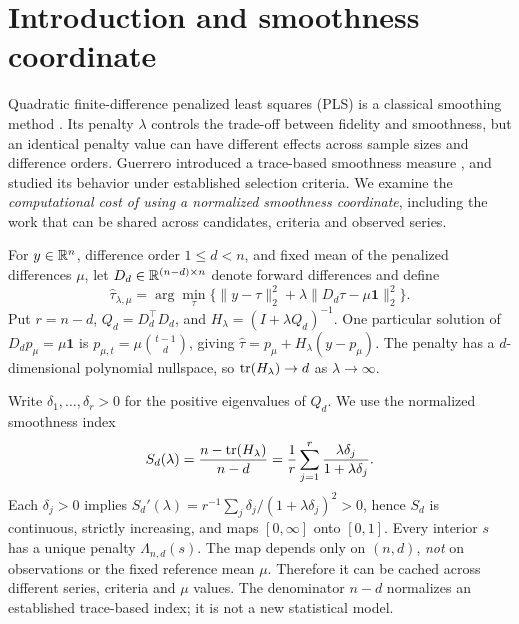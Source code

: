 \section{Introduction and smoothness coordinate}\label{sec:foundation}
Quadratic finite-difference penalized least squares (PLS) is a classical smoothing method \citep{whittaker1923,guerrero2007}. Its penalty $\lambda$ controls the trade-off between fidelity and smoothness, but an identical penalty value can have different effects across sample sizes and difference orders. Guerrero introduced a trace-based smoothness measure \citep{guerrero2008}, and \citet{cortes2017} studied its behavior under established selection criteria. We examine the \emph{computational cost of using a normalized smoothness coordinate}, including the work that can be shared across candidates, criteria and observed series.

For $y\in\mathbb R^n$, difference order $1\le d<n$, and fixed mean of the penalized differences $\mu$, let $D_d\in\mathbb R^{(n-d)\times n}$ denote forward differences and define
\begin{equation}\label{eq:pls}
\widehat\tau_{\lambda,\mu}
=\arg\min_\tau\{\|y-\tau\|_2^2+
\lambda\|D_d\tau-\mu\mathbf1\|_2^2\}.
\end{equation}
Put $r=n-d$, $Q_d=D_d^\top D_d$, and $H_\lambda=(I+\lambda Q_d)^{-1}$. One particular solution of $D_dp_\mu=\mu\mathbf1$ is $p_{\mu,t}=\mu\binom{t-1}{d}$, giving $\widehat\tau=p_\mu+H_\lambda(y-p_\mu)$. The penalty has a $d$-dimensional polynomial nullspace, so $\operatorname{tr}(H_\lambda)\to d$ as $\lambda\to\infty$.

Write $\delta_1,\ldots,\delta_r>0$ for the positive eigenvalues of $Q_d$. We use the normalized smoothness index
\begin{equation}\label{eq:S}
S_d(\lambda)=\frac{n-\operatorname{tr}(H_\lambda)}{n-d}
=\frac1r\sum_{j=1}^{r}\frac{\lambda\delta_j}{1+\lambda\delta_j}.
\end{equation}
Each $\delta_j>0$ implies $S_d'(\lambda)=r^{-1}\sum_j\delta_j/(1+\lambda\delta_j)^2>0$, hence $S_d$ is continuous, strictly increasing, and maps $[0,\infty]$ onto $[0,1]$. Every interior $s$ has a unique penalty $\Lambda_{n,d}(s)$. The map depends only on $(n,d)$, \emph{not} on observations or the fixed reference mean $\mu$. Therefore it can be cached across different series, criteria and $\mu$ values. The denominator $n-d$ normalizes an established trace-based index; it is not a new statistical model.

